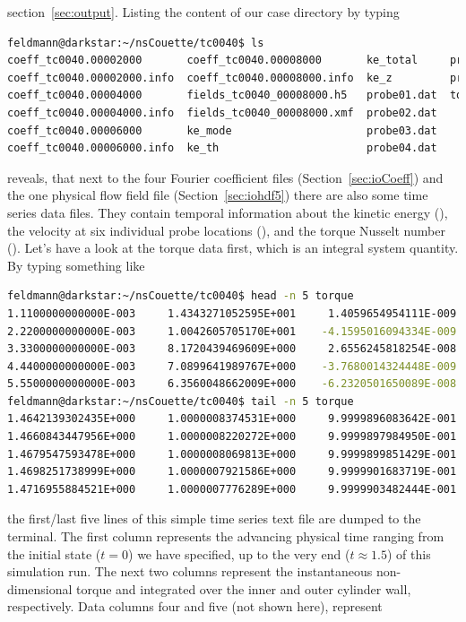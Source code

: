 \documentclass[a4paper, 11pt, DIV=11]{scrartcl}
\begin{document}
section~\ref{sec:output}. Listing the content of our case directory by typing
\begin{lstlisting}[language=bash]
feldmann@darkstar:~/nsCouette/tc0040$ ls
coeff_tc0040.00002000	    coeff_tc0040.00008000	    ke_total     probe05.dat
coeff_tc0040.00002000.info  coeff_tc0040.00008000.info	ke_z	     probe06.dat
coeff_tc0040.00004000	    fields_tc0040_00008000.h5	probe01.dat  torque
coeff_tc0040.00004000.info  fields_tc0040_00008000.xmf	probe02.dat
coeff_tc0040.00006000	    ke_mode			            probe03.dat
coeff_tc0040.00006000.info  ke_th			            probe04.dat
\end{lstlisting}
reveals, that next to the four Fourier coefficient files (Section~\ref{sec:ioCoeff})
and the one physical flow field file (Section~\ref{sec:iohdf5}) there are also some
time series data files. They contain temporal information about the kinetic energy
(), the velocity at six individual probe locations (),
and the torque Nusselt number (). Let's have a look at the torque
data first, which is an integral system quantity. By typing something like
\begin{lstlisting}[language=bash]
feldmann@darkstar:~/nsCouette/tc0040$ head -n 5 torque
1.1100000000000E-003     1.4343271052595E+001     1.4059654954111E-009   ...
2.2200000000000E-003     1.0042605705170E+001    -4.1595016094334E-009   ...
3.3300000000000E-003     8.1720439469609E+000     2.6556245818254E-008   ...
4.4400000000000E-003     7.0899641989767E+000    -3.7680014324448E-009   ...
5.5500000000000E-003     6.3560048662009E+000    -6.2320501650089E-008   ...
feldmann@darkstar:~/nsCouette/tc0040$ tail -n 5 torque
1.4642139302435E+000     1.0000008374531E+000     9.9999896083642E-001   ...
1.4660843447956E+000     1.0000008220272E+000     9.9999897984950E-001   ...
1.4679547593478E+000     1.0000008069813E+000     9.9999899851429E-001   ...
1.4698251738999E+000     1.0000007921586E+000     9.9999901683719E-001   ...
1.4716955884521E+000     1.0000007776289E+000     9.9999903482444E-001   ...
\end{lstlisting}
the first/last five lines of this simple time series text file are dumped to the
terminal. The first column represents the advancing physical time ranging from
the initial state ($t=0$) we have specified, up to the very end ($t\approx\num{1.5}$)
of this simulation run. The next two columns represent the instantaneous
non-dimensional torque \Nuomi and \Nuomo integrated over the inner and outer
cylinder wall, respectively. Data columns four and five (not shown here), represent
\end{document}
